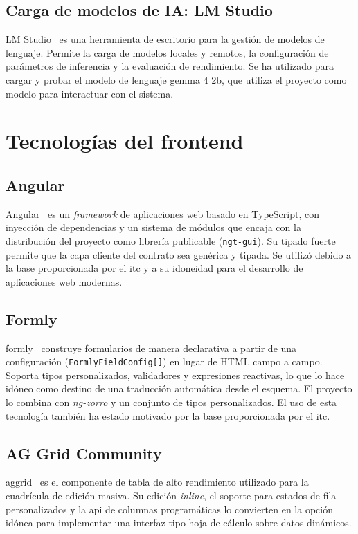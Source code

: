 \subsection{Carga de modelos de IA: LM Studio}
LM Studio~\cite{lmstudio} es una herramienta de escritorio para la gestión de
modelos de lenguaje. Permite la carga de modelos locales y remotos, la
configuración de parámetros de inferencia y la evaluación de rendimiento. Se ha utilizado para cargar 
y probar el modelo de lenguaje gemma 4 2b, que utiliza el proyecto como modelo para
interactuar con el sistema.

\section{Tecnologías del frontend}

\subsection{Angular}
Angular~\cite{angular} es un \emph{framework} de aplicaciones web basado en
TypeScript, con inyección de dependencias y un sistema de módulos que encaja
con la distribución del proyecto como librería publicable (\texttt{ngt-gui}).
Su tipado fuerte permite que la capa cliente del contrato sea genérica y
tipada. Se utilizó debido a la base proporcionada por el \gls{itc} y a su 
idoneidad para el desarrollo de aplicaciones web modernas.

\subsection{Formly}
\gls{formly}~\cite{formly} construye formularios de manera declarativa a
partir de una configuración (\texttt{FormlyFieldConfig[]}) en lugar de HTML
campo a campo. Soporta tipos personalizados, validadores y expresiones
reactivas, lo que lo hace idóneo como destino de una traducción automática
desde el esquema. El proyecto lo combina con \emph{ng-zorro} y un conjunto de
tipos personalizados. El uso de esta tecnología también ha estado motivado por la base proporcionada por el \gls{itc}.

\subsection{AG Grid Community}
\gls{aggrid}~\cite{aggrid} es el componente de tabla de alto rendimiento utilizado para la
cuadrícula de edición masiva. Su edición \emph{inline}, el soporte para estados de fila
personalizados y la \gls{api} de columnas programáticas lo convierten en la opción idónea para
implementar una interfaz tipo hoja de cálculo sobre datos dinámicos.

